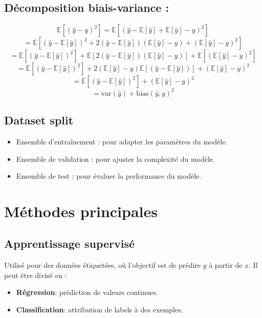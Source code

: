 \documentclass[a4paper,portrait]{article}
\begin{document}
\begin{multicols}{2}
\subsection{Décomposition biais-variance :}
\[
\mathbb{E}\left[(\hat{y} - y)^2\right] = \mathbb{E}\left[(\hat{y} - \mathbb{E}[\hat{y}] + \mathbb{E}[\hat{y}] - y)^2\right]
\]
\[
= \mathbb{E}\left[(\hat{y} - \mathbb{E}[\hat{y}])^2 + 2(\hat{y} - \mathbb{E}[\hat{y}])(\mathbb{E}[\hat{y}] - y) + (\mathbb{E}[\hat{y}] - y)^2\right]
\]
\[
= \mathbb{E}\left[(\hat{y} - \mathbb{E}[\hat{y}])^2\right] + \mathbb{E}\left[2(\hat{y} - \mathbb{E}[\hat{y}])(\mathbb{E}[\hat{y}] - y)\right] + \mathbb{E}\left[(\mathbb{E}[\hat{y}] - y)^2\right]
\]
\[
= \mathbb{E}\left[(\hat{y} - \mathbb{E}[\hat{y}])^2\right] + 2(\mathbb{E}[\hat{y}] - y)\mathbb{E}\left[(\hat{y} - \mathbb{E}[\hat{y}])\right] + (\mathbb{E}[\hat{y}] - y)^2
\]
\[
= \mathbb{E}\left[(\hat{y} - \mathbb{E}[\hat{y}])^2\right] + (\mathbb{E}[\hat{y}] - y)^2
\]
\[
= \mathrm{var}(\hat{y}) + \mathrm{bias}(\hat{y}, y)^2
\]

\subsection{Dataset split}
\begin{itemize}
    \item Ensemble d'entraînement : pour adapter les paramètres du modèle.
    \item Ensemble de validation : pour ajuster la complexité du modèle.
    \item Ensemble de test : pour évaluer la performance du modèle.
\end{itemize}

\section{Méthodes principales}

\subsection{Apprentissage supervisé}
Utilisé pour des données étiquetées, où l'objectif est de prédire \(y\) à partir de \(x\). Il peut être divisé en :

\begin{itemize}
    \item \textbf{Régression}: prédiction de valeurs continues.
    \item \textbf{Classification}: attribution de labels à des exemples.
\end{itemize}


\end{multicols}
\end{document}
